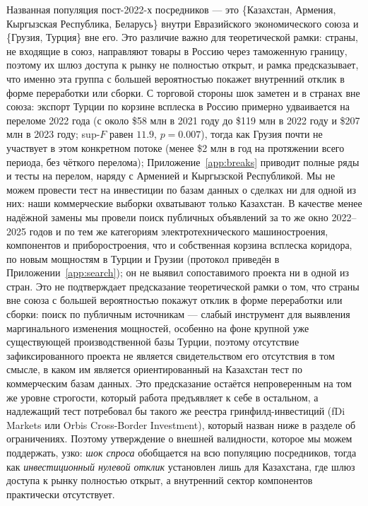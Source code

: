 \documentclass[12pt]{article}
\begin{document}
Названная популяция пост-2022-х посредников — это \{Казахстан, Армения, Кыргызская
Республика, Беларусь\} внутри Евразийского экономического союза и \{Грузия, Турция\} вне
его. Это различие важно для теоретической рамки: страны, не входящие в союз, направляют
товары в Россию через таможенную границу, поэтому их шлюз доступа к рынку не полностью
открыт, и рамка предсказывает, что именно эта группа с большей вероятностью покажет
внутренний отклик в форме переработки или сборки. С торговой стороны шок заметен и в
странах вне союза: экспорт Турции по корзине всплеска в Россию примерно удваивается на
переломе 2022 года (с около \$58 млн в 2021 году до \$119 млн в 2022 году и \$207 млн в
2023 году; sup-$F$ равен $11.9$, $p = 0.007$), тогда как Грузия почти не участвует в этом
конкретном потоке (менее \$2 млн в год на протяжении всего периода, без чёткого перелома);
Приложение~\ref{app:breaks} приводит полные ряды и тесты на перелом, наряду с Арменией и
Кыргызской Республикой. Мы не можем провести тест на инвестиции по базам данных о сделках
ни для одной из них: наши коммерческие выборки охватывают только Казахстан. В качестве менее
надёжной замены мы провели поиск публичных объявлений за то же окно 2022--2025 годов и по
тем же категориям электротехнического машиностроения, компонентов и приборостроения, что и
собственная корзина всплеска коридора, по новым мощностям в Турции и Грузии (протокол
приведён в Приложении~\ref{app:search}); он не выявил сопоставимого проекта ни в одной из
стран. Это не подтверждает предсказание теоретической рамки о том, что страны вне союза с
большей вероятностью покажут отклик в форме переработки или сборки: поиск по публичным
источникам — слабый инструмент для выявления маргинального изменения мощностей, особенно
на фоне крупной уже существующей производственной базы Турции, поэтому отсутствие
зафиксированного проекта не является свидетельством его отсутствия в том смысле, в каком им
является ориентированный на Казахстан тест по коммерческим базам данных. Это предсказание
остаётся непроверенным на том же уровне строгости, который работа предъявляет к себе в
остальном, а надлежащий тест потребовал бы такого же реестра гринфилд-инвестиций (fDi
Markets или Orbis Cross-Border Investment), который назван ниже в разделе об ограничениях.
Поэтому утверждение о внешней валидности, которое мы можем поддержать, узко: \emph{шок
спроса} обобщается на всю популяцию посредников, тогда как \emph{инвестиционный нулевой
отклик} установлен лишь для Казахстана, где шлюз доступа к рынку полностью открыт, а
внутренний сектор компонентов практически отсутствует.
\end{document}
